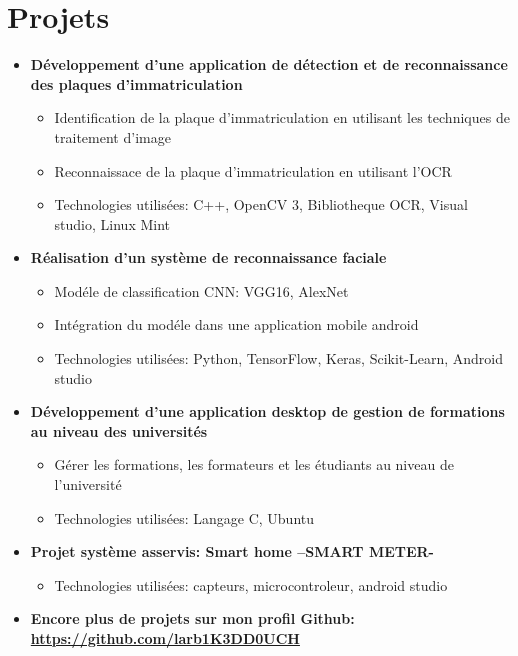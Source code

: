 \documentclass[letterpaper,9pt]{article}
\newcommand{\resumeItem}[2]{
  \item\small{
    {#1} { #2 \vspace{-2pt}}
  }
}
\newcommand{\resumeSubItem}[2]{\resumeItem{\textbf{#1}}{#2}\vspace{-4pt}}
\newcommand{\resumeSubHeadingListStart}{\begin{itemize}[leftmargin=*]}
\newcommand{\resumeSubHeadingListEnd}{\end{itemize}}
\newcommand{\resumeItemListStart}{\begin{itemize}}
\newcommand{\resumeItemListEnd}{\end{itemize}\vspace{-5pt}}
\begin{document}
\section{Projets}
\color{black}
  \resumeSubHeadingListStart
    \resumeSubItem
    {Développement d'une application de détection et de reconnaissance des plaques d'immatriculation}
      {} 
	\resumeItemListStart
		\resumeItem{Identification de la plaque d'immatriculation en utilisant les techniques de traitement d'image}{}
        \resumeItem{Reconnaissace de la plaque d'immatriculation en utilisant l'OCR}{}
        \resumeItem{Technologies utilisées: C++, OpenCV 3, Bibliotheque OCR, Visual studio, Linux Mint}{}
      \resumeItemListEnd    
    \resumeSubItem
    {Réalisation d’un système de reconnaissance faciale}{}
    \resumeItemListStart
    \resumeItem{Modéle de classification CNN: VGG16, AlexNet}{}
    \resumeItem{Intégration du modéle dans une application mobile android }{}
    \resumeItem{Technologies utilisées: Python, TensorFlow, Keras, Scikit-Learn, Android studio}{}
    \resumeItemListEnd
    \resumeSubItem
    {Développement d'une application desktop de gestion de formations au niveau des universités}
      {} 
	\resumeItemListStart
		\resumeItem{Gérer les formations, les formateurs et les étudiants au niveau de l'université}{}
        \resumeItem{Technologies utilisées: Langage C, Ubuntu}{}
      \resumeItemListEnd    
    
 \resumeSubItem
    {Projet système asservis: Smart home –SMART METER-}{}
    \resumeItemListStart
    \resumeItem{Technologies utilisées: capteurs, microcontroleur, android studio}{}
    \resumeItemListEnd    
    \resumeSubItem
    {Encore plus de projets sur mon profil Github: \url{https://github.com/larb1K3DD0UCH}}
      {}       
      \resumeSubHeadingListEnd
%
\color{blue}
\end{document}

